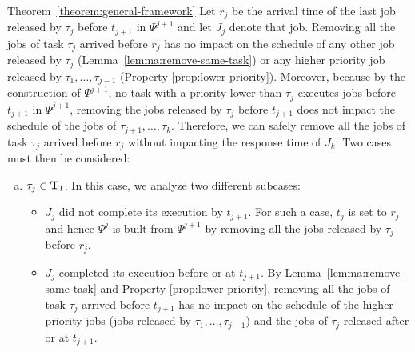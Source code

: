 \begin{appProof}{Theorem~\ref{theorem:general-framework}}
Let $r_j$ be the arrival time of the last job released by $\tau_j$ before $t_{j+1}$ in $\Psi^{j+1}$ and let $J_{j}$ denote that job. %
Removing all the jobs of task $\tau_j$ arrived before $r_j$ has no impact on the schedule of any other job released by $\tau_j$ (Lemma~\ref{lemma:remove-same-task}) or any higher priority job released by $\tau_1, \ldots, \tau_{j-1}$ (Property \ref{prop:lower-priority}). Moreover, because by the construction of $\Psi^{j+1}$, no task with a priority lower than $\tau_j$ executes jobs before $t_{j+1}$ in $\Psi^{j+1}$, removing the jobs released by $\tau_j$ before $t_{j+1}$ does not impact the schedule of the jobs of $\tau_{j+1}, \ldots, \tau_{k}$. Therefore, we can safely remove all the jobs of task $\tau_j$ arrived before $r_j$ without impacting the response time of $J_{k}$. Two cases must then be considered:
\begin{enumerate}[(a)]
\item $\tau_j \in {\bf T}_1$. In this case, we analyze two different subcases:
\begin{itemize}
\item $J_{j}$ did not complete its execution by $t_{j+1}$. For such a case, $t_{j}$ is set to $r_j$ and hence $\Psi^j$ is built from $\Psi^{j+1}$ by removing all the jobs released by $\tau_j$ before $r_j$.
\item $J_{j}$ completed its execution before or at $t_{j+1}$. By Lemma~\ref{lemma:remove-same-task} and Property \ref{prop:lower-priority}, removing all the jobs of task $\tau_j$ arrived before $t_{j+1}$ has no impact on the schedule of the higher-priority jobs (jobs released by $\tau_1, \ldots, \tau_{j-1}$) and the jobs of $\tau_j$ released after or at $t_{j+1}$. 

\end{itemize}
\end{enumerate}
\end{appProof}
